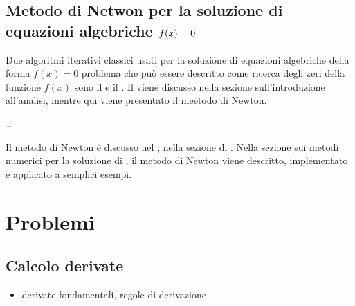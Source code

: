 \documentclass[letterpaper,10pt,italian]{jupyterBook}
\begin{document}
\subsection{Metodo di Netwon per la soluzione di equazioni algebriche \protect\(f(x) = 0\protect\)}
\label{\detokenize{ch/infinitesimal_calculus/derivatives:metodo-di-netwon-per-la-soluzione-di-equazioni-algebriche-f-x-0}}\label{\detokenize{ch/infinitesimal_calculus/derivatives:infinitesimal-calculus-derivatives-applications-newton}}
\sphinxAtStartPar
Due algoritmi iterativi classici usati per la soluzione di equazioni algebriche della forma \(f(x) = 0\) \sphinxhyphen{} problema che può essere descritto come ricerca degli zeri della funzione \(f(x)\) \sphinxhyphen{} sono il  e il . Il {\hyperref[\detokenize{ch/infinitesimal_calculus/analysis:infinitesimal-calculus-analysis-bisec}]{}} viene discusso nella sezione sull’introduzione all’analisi, mentre qui viene presentato il meetodo di Newton.

\sphinxAtStartPar
…

\sphinxAtStartPar
Il metodo di Newton è discusso nel , nella sezione di . Nella sezione sui metodi numerici per la soluzione di , il metodo di Newton viene descritto, implementato e applicato a semplici esempi.

\sphinxstepscope


\section{Problemi}
\label{\detokenize{ch/infinitesimal_calculus/derivatives-problems:problemi}}\label{\detokenize{ch/infinitesimal_calculus/derivatives-problems:infinitesimal-calculus-derivatives-problems}}\label{\detokenize{ch/infinitesimal_calculus/derivatives-problems::doc}}

\subsection{Calcolo derivate}
\label{\detokenize{ch/infinitesimal_calculus/derivatives-problems:calcolo-derivate}}\label{\detokenize{ch/infinitesimal_calculus/derivatives-problems:infinitesimal-calculus-derivatives-problems-eval}}\begin{itemize}
\item {} 
\sphinxAtStartPar
derivate fondamentali, regole di derivazione

\end{itemize}
 \label{exercise:ch/infinitesimal_calculus/derivatives-problems-exercise-0}
\end{document}

